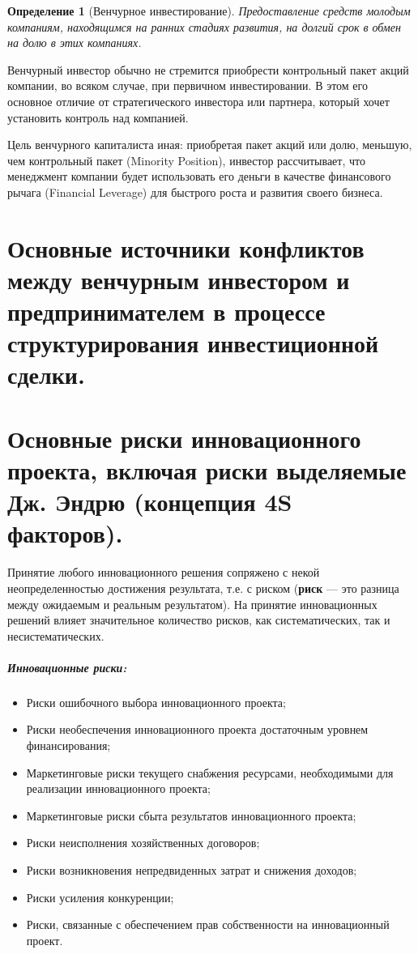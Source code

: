 \documentclass[11pt]{article}
\theoremstyle{plain} %
\newtheorem{proposition}[theorem]{Определение}
\theoremstyle{definition} %
\theoremstyle{remark} %
\begin{document}
\begin{proposition}[Венчурное инвестирование]
	Предоставление средств молодым компаниям, находящимся на ранних стадиях развития, на долгий срок в обмен на долю в этих компаниях.
\end{proposition}

Венчурный инвестор обычно не стремится приобрести контрольный пакет акций компании, во всяком случае, при первичном инвестировании. В этом его основное отличие от стратегического инвестора или партнера, который хочет установить контроль над компанией.

Цель венчурного капиталиста иная: приобретая пакет акций или долю, меньшую, чем контрольный пакет (Minority Position), инвестор рассчитывает, что менеджмент компании будет использовать его деньги в качестве финансового рычага (Financial Leverage) для быстрого роста и развития своего бизнеса.
\newpage

\section{Основные источники конфликтов между венчурным инвестором и предпринимателем в процессе структурирования инвестиционной сделки.}\label{erste}

\newpage

\section{Основные риски инновационного проекта, включая риски выделяемые Дж. Эндрю (концепция 4S факторов).}\label{erste}

Принятие   любого   инновационного   решения   сопряжено   с   некой неопределенностью  достижения  результата,  т.е.  с  риском  (\textbf{риск} --- это  разница между  ожидаемым  и  реальным  результатом).  На  принятие  инновационных решений  влияет  значительное  количество  рисков,  как  систематических,  так  и несистематических.

\subparagraph{Инновационные риски:}
\begin{itemize}
	\item Риски ошибочного выбора инновационного проекта;
	\item Риски  необеспечения  инновационного  проекта  достаточным  уровнем финансирования;
	\item Маркетинговые риски текущего снабжения ресурсами, необходимыми для реализации инновационного проекта;
	\item Маркетинговые риски сбыта результатов инновационного проекта;
	\item Риски неисполнения хозяйственных договоров;
	\item Риски возникновения непредвиденных затрат и снижения доходов;
	\item Риски усиления конкуренции;
	\item Риски,   связанные   с   обеспечением   прав   собственности   на инновационный проект.
\end{itemize}
\end{document}
